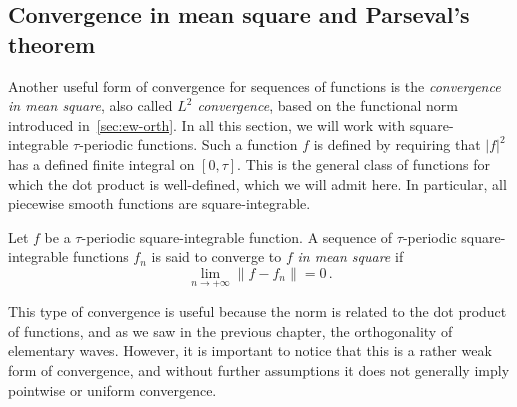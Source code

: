 \subsection{Convergence in mean square and Parseval's theorem}
\label{sec:series-l2-conv}
Another useful form of convergence for sequences of functions is the \emph{convergence in
mean square}, also called \emph{$L^2$ convergence}, based on the functional norm
introduced in~\cref{sec:ew-orth}. In all this section, we will work with square-integrable
$\tau$-periodic functions. Such a function $f$ is defined by requiring that $|f|^2$ has a
defined finite integral on $[0,\tau]$. This is the general class of functions for which
the dot product is well-defined, which we will admit here. In particular, all piecewise
smooth functions are square-integrable.
\begin{definition}
  Let $f$ be a $\tau$-periodic square-integrable function. A sequence of $\tau$-periodic
  square-integrable functions $f_n$ is said to converge to $f$ \emph{in mean square} if
  \begin{equation}
    \lim_{n\to+\infty}\|f-f_n\|=0\,.
  \end{equation}
\end{definition}
This type of convergence is useful because the norm is related to the dot product of
functions, and as we saw in the previous chapter, the orthogonality of elementary waves.
However, it is important to notice that this is a rather weak form of convergence, and
without further assumptions it does not generally imply pointwise or uniform convergence.

